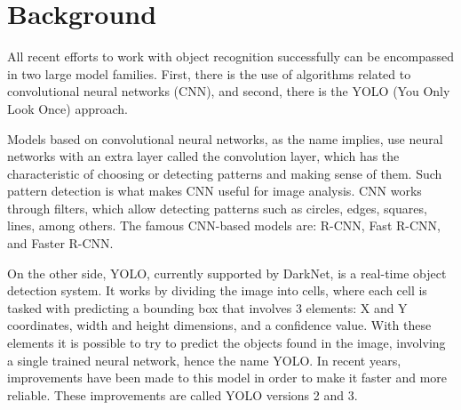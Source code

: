 \section{Background}

All recent efforts to work with object recognition successfully can be encompassed in two large model families. First, there is the use of algorithms related to convolutional neural networks (CNN), and second, there is the YOLO (You Only Look Once) approach.

Models based on convolutional neural networks, as the name implies, use neural networks with an extra layer called the convolution layer, which has the characteristic of choosing or detecting patterns and making sense of them. Such pattern detection is what makes CNN useful for image analysis. CNN works through filters, which allow detecting patterns such as circles, edges, squares, lines, among others. The famous CNN-based models are: R-CNN, Fast R-CNN, and Faster R-CNN.

On the other side, YOLO, currently supported by DarkNet, is a real-time object detection system. It works by dividing the image into cells, where each cell is tasked with predicting a bounding box that involves 3 elements: X and Y coordinates, width and height dimensions, and a confidence value. With these elements it is possible to try to predict the objects found in the image, involving a single trained neural network, hence the name YOLO. In recent years, improvements have been made to this model in order to make it faster and more reliable. These improvements are called YOLO versions 2 and 3.

